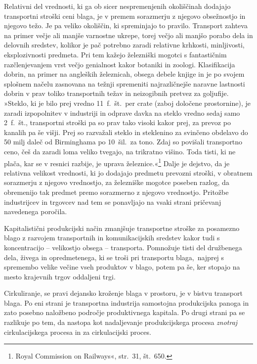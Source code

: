 \documentclass[kapital_02.tex]{subfiles}
\begin{document}
Relativni del vrednosti, ki ga ob sicer nespremenjenih okoliščinah dodajajo transportni stroški ceni blaga, je v premem sorazmerju z njegovo obsežnostjo in njegovo težo.
Je pa veliko okoliščin, ki spreminjajo to pravilo.
Transport zahteva na primer večje ali manjše varnostne ukrepe, torej večjo ali manjšo porabo dela in delovnih sredstev, kolikor je pač potrebno zaradi relativne krhkosti, minljivosti, eksplozivnosti predmeta.
Pri tem kažejo železniški mogotci s fantastičnim razčlenjevanjem vrst večjo genialnost kakor botaniki in zoologi.
Klasifikacija dobrin, na primer na angleških železnicah, obsega debele knjige in je po svojem splošnem načelu zasnovana na težnji spremeniti najrazličnejše naravne lastnosti dobrin v prav toliko transportnih težav in neizogibnih pretvez za goljufije.
»Steklo, ki je bilo prej vredno 11\ f.\ št.\ per crate (zaboj določene prostornine), je zaradi izpopolnitev v industriji in odprave davka na steklo vredno sedaj samo 2\ f.\ št., transportni stroški pa so prav tako visoki kakor prej, za prevoz po kanalih pa še višji.
Prej so razvažali steklo in steklenino za svinčeno obdelavo do 50 milj daleč od Birminghama po 10\ šil.\ za tono.
Zdaj so povišali transportno ceno, češ da zaradi loma veliko tvegajo, na trikratno višino. 
Toda tisti, ki ne plača, kar se v resnici razbije, je uprava železnice.«\footnote
{Royal Commission on Railways«, str.\ 31, št.\ 650.}
Dalje je dejstvo, da je relativna velikost vrednosti, ki jo dodajajo predmetu prevozni stroški, v obratnem sorazmerju z njegovo vrednostjo, za železniške mogotce poseben razlog, da obremenijo tak predmet premo sorazmerno z njegovo vrednostjo. 
Pritožbe industrijcev in trgovcev nad tem se ponavljajo na vsaki strani pričevanj navedenega poročila.

Kapitalistični produkcijski način zmanjšuje transportne stroške za posamezno blago z razvojem transportnih in komunikacijskih sredstev kakor tudi s koncentracijo -- velikostjo obsega -- transporta.
Pomnožuje tisti del družbenega dela, živega in opredmetenega, ki se troši pri transportu blaga,\KPEstran\ najprej s spremembo velike večine vseh produktov v blago, potem pa še, ker stopajo na mesto krajevnih trgov oddaljeni trgi.

Cirkuliranje, se pravi dejansko kroženje blaga v prostoru, je v bistvu transport blaga.
Po eni strani je transportna industrija samostojna produkcijska panoga in zato posebno naložbeno področje produktivnega kapitala.
Po drugi strani pa se razlikuje po tem, da nastopa kot nadaljevanje produkcijskega procesa \emph{znotraj} cirkulacijskega procesa in za cirkulacijski proces.
\end{document}
